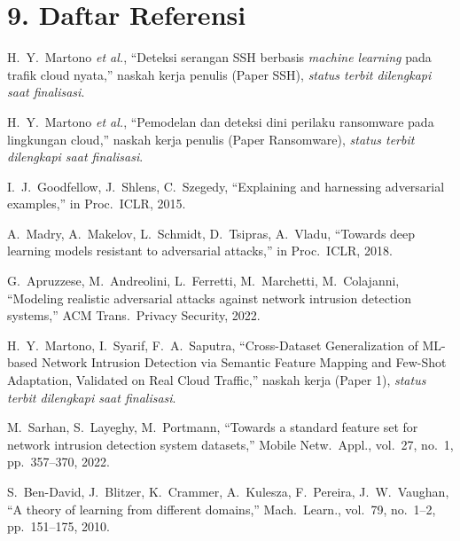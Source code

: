 \documentclass[11pt,a4paper]{article}
\begin{document}
\section*{9. Daftar Referensi}
\begin{enumerate}[label={[\arabic*]},leftmargin=2.6em]

\item H.~Y.~Martono \emph{et al.}, ``Deteksi serangan SSH berbasis
\emph{machine learning} pada trafik cloud nyata,'' naskah kerja penulis
(Paper SSH), \emph{status terbit dilengkapi saat finalisasi}.

\item H.~Y.~Martono \emph{et al.}, ``Pemodelan dan deteksi dini perilaku
ransomware pada lingkungan cloud,'' naskah kerja penulis (Paper Ransomware),
\emph{status terbit dilengkapi saat finalisasi}.

\item I.~J.~Goodfellow, J.~Shlens, C.~Szegedy, ``Explaining and harnessing
adversarial examples,'' in Proc.\ ICLR, 2015.

\item A.~Madry, A.~Makelov, L.~Schmidt, D.~Tsipras, A.~Vladu, ``Towards deep
learning models resistant to adversarial attacks,'' in Proc.\ ICLR, 2018.

\item G.~Apruzzese, M.~Andreolini, L.~Ferretti, M.~Marchetti, M.~Colajanni,
``Modeling realistic adversarial attacks against network intrusion detection
systems,'' ACM Trans.\ Privacy Security, 2022.

\item H.~Y.~Martono, I.~Syarif, F.~A.~Saputra, ``Cross-Dataset Generalization
of ML-based Network Intrusion Detection via Semantic Feature Mapping and
Few-Shot Adaptation, Validated on Real Cloud Traffic,'' naskah kerja (Paper 1),
\emph{status terbit dilengkapi saat finalisasi}.

\item M.~Sarhan, S.~Layeghy, M.~Portmann, ``Towards a standard feature set for
network intrusion detection system datasets,'' Mobile Netw.\ Appl., vol.~27,
no.~1, pp.~357--370, 2022.

\item S.~Ben-David, J.~Blitzer, K.~Crammer, A.~Kulesza, F.~Pereira,
J.~W.~Vaughan, ``A theory of learning from different domains,'' Mach.\ Learn.,
vol.~79, no.~1--2, pp.~151--175, 2010.


\end{enumerate}
\end{document}
